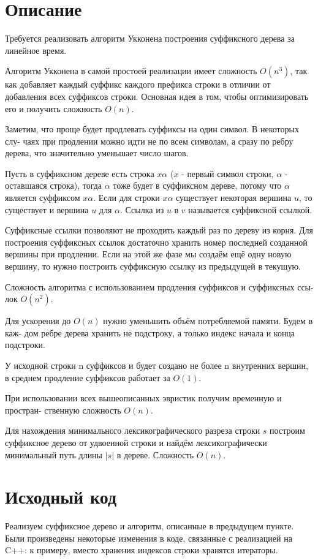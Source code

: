 \section{Описание}
Требуется реализовать алгоритм Укконена построения суффиксного дерева за линейное время.

Алгоритм Укконена в самой простоей реализации имеет сложность $O(n^3)$, так как
добавляет каждый суффикс каждого префикса строки в отличии от добавления всех суффиксов строки. Основная идея в том, чтобы оптимизировать его и получить
сложность $O(n)$.

Заметим, что проще будет продлевать суффиксы на один символ. В некоторых слу-
чаях при продлении можно идти не по всем символам, а сразу по ребру дерева, что
значительно уменьшает число шагов.

Пусть в суффиксном дереве есть строка $x\alpha$ ($x$ - первый символ строки, $\alpha$ - оставшаяся строка), тогда $\alpha$ тоже будет в суффиксном дереве, потому что $\alpha$ является
суффиксом $x\alpha$. Если для строки $x\alpha$ существует некоторая вершина $u$, то существует и вершина $u$ для $\alpha$. Ссылка из $u$ в $v$ называется суффиксной ссылкой.

Суффиксные ссылки позволяют не проходить каждый раз по дереву из корня. Для
построения суффиксных ссылок достаточно хранить номер последней созданной вершины при продлении. Если на этой же фазе мы создаём ещё одну новую вершину, то нужно построить суффиксную ссылку из предыдущей в текущую.

Сложность алгоритма с использованием продления суффиксов и суффиксных ссы-
лок $O(n^2)$.

Для ускорения до $O(n)$ нужно уменьшить объём потребляемой памяти. Будем в каж-
дом ребре дерева хранить не подстроку, а только индекс начала и конца подстроки.

У исходной строки n суффиксов и будет создано не более n внутренних вершин, в
среднем продление суффиксов работает за $O(1)$.

При использовании всех вышеописанных эвристик получим временную и простран-
ственную сложность $O(n)$.

Для нахождения минимального лексикографического разреза строки $s$ построим суффиксное дерево от удвоенной строки и найдём лексикографически минимальный
путь длины $|s|$ в дереве. Сложность $O(n)$.
\pagebreak

\section{Исходный код}
Реализуем суффиксное дерево и алгоритм, описанные в предыдущем пункте. Были произведены некоторые изменения в коде, связанные с реализацией на C++: к примеру, вместо хранения индексов строки хранятся итераторы.

